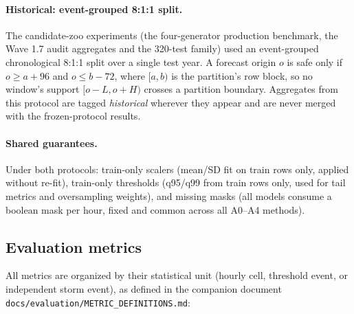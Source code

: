 \paragraph{Historical: event-grouped 8:1:1 split.} The candidate-zoo
experiments (the four-generator production benchmark, the Wave 1.7 audit
aggregates and the 320-test family) used an event-grouped chronological
8:1:1 split over a single test year. A forecast origin $o$ is safe only if
$o \geq a + 96$ and $o \leq b - 72$, where $[a, b)$ is the partition's row
block, so no window's support $[o-L, o+H)$ crosses a partition boundary.
Aggregates from this protocol are tagged \emph{historical} wherever they
appear and are never merged with the frozen-protocol results.

\paragraph{Shared guarantees.} Under both protocols: train-only scalers
(mean/SD fit on train rows only, applied without re-fit), train-only
thresholds (q95/q99 from train rows only, used for tail metrics and
oversampling weights), and missing masks (all models consume a boolean mask
per hour, fixed and common across all A0--A4 methods).

\subsection{Evaluation metrics}
All metrics are organized by their statistical unit (hourly cell, threshold event,
or independent storm event), as defined in the companion document
\texttt{docs/evaluation/METRIC\_DEFINITIONS.md}:

